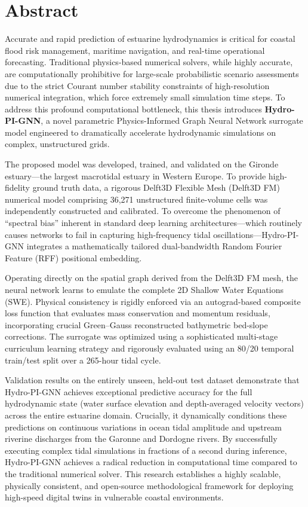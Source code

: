 \chapter*{Abstract}

Accurate and rapid prediction of estuarine hydrodynamics is critical for coastal flood risk management, maritime navigation, and real-time operational forecasting. Traditional physics-based numerical solvers, while highly accurate, are computationally prohibitive for large-scale probabilistic scenario assessments due to the strict Courant number stability constraints of high-resolution numerical integration, which force extremely small simulation time steps. To address this profound computational bottleneck, this thesis introduces \textbf{Hydro-PI-GNN}, a novel parametric Physics-Informed Graph Neural Network surrogate model engineered to dramatically accelerate hydrodynamic simulations on complex, unstructured grids. 

The proposed model was developed, trained, and validated on the Gironde estuary---the largest macrotidal estuary in Western Europe. To provide high-fidelity ground truth data, a rigorous Delft3D Flexible Mesh (Delft3D FM) numerical model comprising 36,271 unstructured finite-volume cells was independently constructed and calibrated. To overcome the phenomenon of ``spectral bias'' inherent in standard deep learning architectures---which routinely causes networks to fail in capturing high-frequency tidal oscillations---Hydro-PI-GNN integrates a mathematically tailored dual-bandwidth Random Fourier Feature (RFF) positional embedding. 

Operating directly on the spatial graph derived from the Delft3D FM mesh, the neural network learns to emulate the complete 2D Shallow Water Equations (SWE). Physical consistency is rigidly enforced via an autograd-based composite loss function that evaluates mass conservation and momentum residuals, incorporating crucial Green--Gauss reconstructed bathymetric bed-slope corrections. The surrogate was optimized using a sophisticated multi-stage curriculum learning strategy and rigorously evaluated using an 80/20 temporal train/test split over a 265-hour tidal cycle.

Validation results on the entirely unseen, held-out test dataset demonstrate that Hydro-PI-GNN achieves exceptional predictive accuracy for the full hydrodynamic state (water surface elevation and depth-averaged velocity vectors) across the entire estuarine domain. Crucially, it dynamically conditions these predictions on continuous variations in ocean tidal amplitude and upstream riverine discharges from the Garonne and Dordogne rivers. By successfully executing complex tidal simulations in fractions of a second during inference, Hydro-PI-GNN achieves a radical reduction in computational time compared to the traditional numerical solver. This research establishes a highly scalable, physically consistent, and open-source methodological framework for deploying high-speed digital twins in vulnerable coastal environments.
